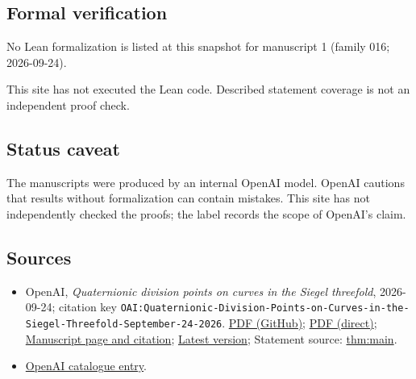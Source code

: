 \documentclass[11pt]{article}
\begin{document}
\subsection{Formal verification}
No Lean formalization is listed at this snapshot for manuscript 1 (family 016; 2026-09-24).

This site has not executed the Lean code. Described statement coverage is not an independent proof check.

\subsection{Status caveat}
The manuscripts were produced by an internal OpenAI model. OpenAI cautions that results without formalization can contain mistakes. This site has not independently checked the proofs; the label records the scope of OpenAI's claim.

\subsection{Sources}
\begin{itemize}
\item OpenAI, \emph{Quaternionic division points on curves in the Siegel threefold}, 2026-09-24; citation key \texttt{OAI:Quaternionic-Division-Points-on-Curves-in-the-Siegel-Threefold-September-24-2026}. \href{https://github.com/openai/math/blob/adc7f1241b42e322a6451854ab7e4b4c146bf78a/preprints/Quaternionic-Division-Points-on-Curves-in-the-Siegel-Threefold-September-24-2026/paper.pdf}{PDF (GitHub)}; \href{https://github.com/openai/math/raw/adc7f1241b42e322a6451854ab7e4b4c146bf78a/preprints/Quaternionic-Division-Points-on-Curves-in-the-Siegel-Threefold-September-24-2026/paper.pdf}{PDF (direct)}; \href{https://github.com/openai/math/blob/adc7f1241b42e322a6451854ab7e4b4c146bf78a/preprints/Quaternionic-Division-Points-on-Curves-in-the-Siegel-Threefold-September-24-2026/README.md}{Manuscript page and citation}; \href{https://github.com/openai/math/blob/main/preprints/Quaternionic-Division-Points-on-Curves-in-the-Siegel-Threefold-September-24-2026/paper.pdf}{Latest version}; Statement source: \href{https://github.com/openai/math/blob/adc7f1241b42e322a6451854ab7e4b4c146bf78a/preprints/Quaternionic-Division-Points-on-Curves-in-the-Siegel-Threefold-September-24-2026/build/sections/00-introduction.tex\#L11}{thm:main}.
\item \href{https://github.com/openai/math/blob/adc7f1241b42e322a6451854ab7e4b4c146bf78a/CONTENTS.md}{OpenAI catalogue entry}.
\end{itemize}
\end{document}
